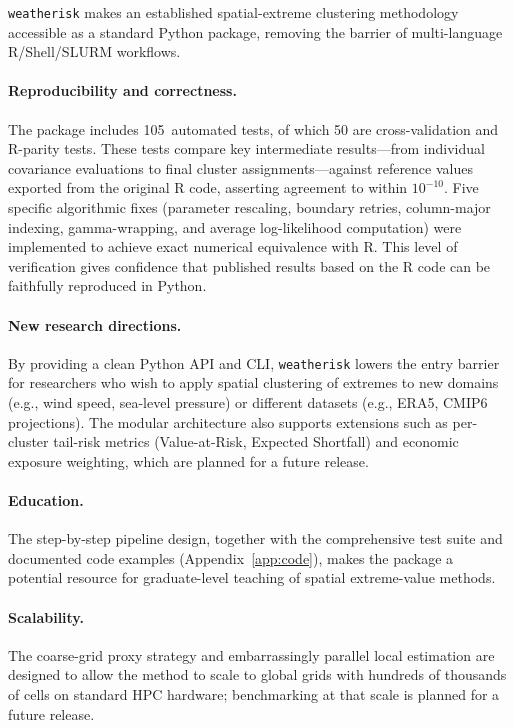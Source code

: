 \documentclass[preprint,12pt,a4paper]{elsarticle}
\begin{document}
\texttt{weatherisk} makes an established spatial-extreme clustering
methodology accessible as a standard Python package, removing
the barrier of multi-language R/Shell/SLURM workflows.

\paragraph{Reproducibility and correctness.}
The package includes 105~automated tests, of which 50 are
cross-validation and R-parity tests.  These tests compare key intermediate results---from individual
covariance evaluations to final cluster assignments---against
reference values exported from the original R code, asserting
agreement to within $10^{-10}$.  Five specific algorithmic fixes (parameter rescaling,
boundary retries, column-major indexing, gamma-wrapping, and
average log-likelihood computation) were implemented to achieve
exact numerical equivalence with R.  This level of verification
gives confidence that published results based on the R code can be
faithfully reproduced in Python.

\paragraph{New research directions.}
By providing a clean Python API and CLI, \texttt{weatherisk} lowers
the entry barrier for researchers who wish to apply spatial
clustering of extremes to new domains (e.g., wind speed, sea-level
pressure) or different datasets (e.g., ERA5, CMIP6 projections).
The modular architecture also supports extensions such as
per-cluster tail-risk metrics (Value-at-Risk, Expected Shortfall)
and economic exposure weighting, which are planned for a future
release.

\paragraph{Education.}
The step-by-step pipeline design, together with the comprehensive
test suite and documented code examples (Appendix~\ref{app:code}),
makes the package a potential resource for graduate-level teaching
of spatial extreme-value methods.

\paragraph{Scalability.}
The coarse-grid proxy strategy and embarrassingly parallel local
estimation are designed to allow the method to scale to global
grids with hundreds of thousands of cells on standard HPC
hardware; benchmarking at that scale is planned for a future
release.
\end{document}
